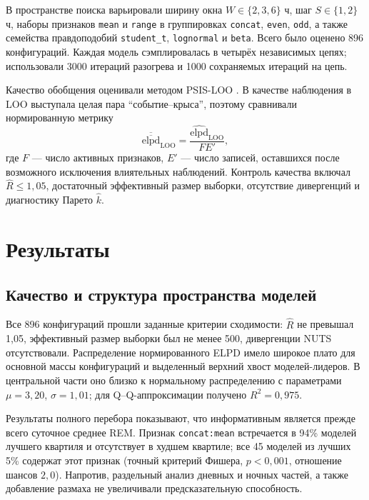 \documentclass[14pt]{mmcs_article}
\newcommand{\elpd}{\mathrm{elpd}}
\begin{document}
В пространстве поиска варьировали ширину окна
$W\in\{2,3,6\}$ ч, шаг $S\in\{1,2\}$ ч, наборы признаков
\texttt{mean} и \texttt{range} в группировках \texttt{concat},
\texttt{even}, \texttt{odd}, а также семейства правдоподобий
\texttt{student\_t}, \texttt{lognormal} и \texttt{beta}.
Всего было оценено 896 конфигураций. Каждая модель сэмплировалась в
четырёх независимых цепях; использовали 3000 итераций разогрева и
1000 сохраняемых итераций на цепь.

Качество обобщения оценивали методом PSIS-LOO
\cite{Vehtari2017,Kumar2019}. В качестве наблюдения в LOO выступала
целая пара ``событие--крыса'', поэтому сравнивали нормированную метрику
\[
\overline{\overline{\elpd}}_{\mathrm{LOO}}=
\frac{\widehat{\elpd}_{\mathrm{LOO}}}{F E'},
\]
где $F$ --- число активных признаков, $E'$ --- число записей,
оставшихся после возможного исключения влиятельных наблюдений. Контроль
качества включал $\hat R\leq1{,}05$, достаточный эффективный размер
выборки, отсутствие дивергенций и диагностику Парето $\hat k$.

\section{Результаты}

\subsection{Качество и структура пространства моделей}

Все 896 конфигураций прошли заданные критерии сходимости: $\hat R$ не
превышал 1,05, эффективный размер выборки был не менее 500, дивергенции
NUTS отсутствовали. Распределение нормированного ELPD имело широкое
плато для основной массы конфигураций и выделенный верхний хвост
моделей-лидеров. В центральной части оно близко к нормальному
распределению с параметрами $\mu=3{,}20$, $\sigma=1{,}01$; для
Q--Q-аппроксимации получено $R^2=0{,}975$.

Результаты полного перебора показывают, что информативным является
прежде всего суточное среднее REM. Признак \texttt{concat:mean}
встречается в 94\% моделей лучшего квартиля и отсутствует в худшем
квартиле; все 45 моделей из лучших 5\% содержат этот признак
(точный критерий Фишера, $p<0{,}001$, отношение шансов $2{,}0$).
Напротив, раздельный анализ дневных и ночных частей, а также добавление
размаха не увеличивали предсказательную способность.
\end{document}
